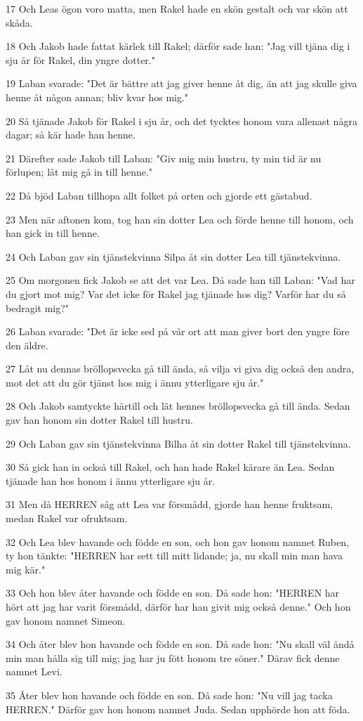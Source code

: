 \par 17 Och Leas ögon voro matta, men Rakel hade en skön gestalt och var skön att skåda.
\par 18 Och Jakob hade fattat kärlek till Rakel; därför sade han: "Jag vill tjäna dig i sju år för Rakel, din yngre dotter."
\par 19 Laban svarade: "Det är bättre att jag giver henne åt dig, än att jag skulle giva henne åt någon annan; bliv kvar hos mig."
\par 20 Så tjänade Jakob för Rakel i sju år, och det tycktes honom vara allenast några dagar; så kär hade han henne.
\par 21 Därefter sade Jakob till Laban: "Giv mig min hustru, ty min tid är nu förlupen; låt mig gå in till henne."
\par 22 Då bjöd Laban tillhopa allt folket på orten och gjorde ett gästabud.
\par 23 Men när aftonen kom, tog han sin dotter Lea och förde henne till honom, och han gick in till henne.
\par 24 Och Laban gav sin tjänstekvinna Silpa åt sin dotter Lea till tjänstekvinna.
\par 25 Om morgonen fick Jakob se att det var Lea. Då sade han till Laban: "Vad har du gjort mot mig? Var det icke för Rakel jag tjänade hos dig? Varför har du så bedragit mig?"
\par 26 Laban svarade: "Det är icke sed på vår ort att man giver bort den yngre före den äldre.
\par 27 Låt nu dennas bröllopsvecka gå till ända, så vilja vi giva dig också den andra, mot det att du gör tjänst hos mig i ännu ytterligare sju år."
\par 28 Och Jakob samtyckte härtill och lät hennes bröllopsvecka gå till ända. Sedan gav han honom sin dotter Rakel till hustru.
\par 29 Och Laban gav sin tjänstekvinna Bilha åt sin dotter Rakel till tjänstekvinna.
\par 30 Så gick han in också till Rakel, och han hade Rakel kärare än Lea. Sedan tjänade han hos honom i ännu ytterligare sju år.
\par 31 Men då HERREN såg att Lea var försmådd, gjorde han henne fruktsam, medan Rakel var ofruktsam.
\par 32 Och Lea blev havande och födde en son, och hon gav honom namnet Ruben, ty hon tänkte: "HERREN har sett till mitt lidande; ja, nu skall min man hava mig kär."
\par 33 Och hon blev åter havande och födde en son. Då sade hon: "HERREN har hört att jag har varit försmådd, därför har han givit mig också denne." Och hon gav honom namnet Simeon.
\par 34 Och åter blev hon havande och födde en son. Då sade hon: "Nu skall väl ändå min man hålla sig till mig; jag har ju fött honom tre söner." Därav fick denne namnet Levi.
\par 35 Åter blev hon havande och födde en son. Då sade hon: "Nu vill jag tacka HERREN." Därför gav hon honom namnet Juda. Sedan upphörde hon att föda.

